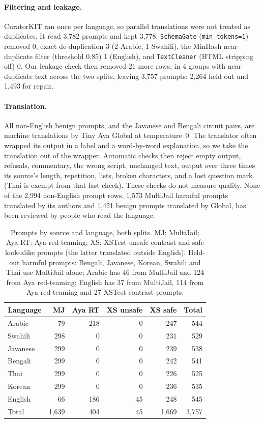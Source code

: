 \documentclass[11pt]{article}
\begin{document}
\paragraph{Filtering and leakage.} CuratorKIT ran once per language, so parallel translations were not treated as
duplicates. It read 3,782 prompts and kept 3,778: \texttt{SchemaGate} (\texttt{min\_tokens=1}) removed 0, exact
de-duplication 3 (2 Arabic, 1 Swahili), the MinHash near-duplicate filter (threshold 0.85) 1 (English), and
\texttt{TextCleaner} (HTML stripping off) 0. Our leakage check then removed 21 more rows, in 4 groups with
near-duplicate text across the two splits, leaving 3,757 prompts: 2,264 held out and 1,493 for repair.

\paragraph{Translation.} All non-English benign prompts, and the Javanese and Bengali circuit pairs, are machine
translations by Tiny Aya Global at temperature~0. The translator often wrapped its output in a label and a
word-by-word explanation, so we take the translation out of the wrapper. Automatic checks then reject empty output,
refusals, commentary, the wrong script, unchanged text, output over three times its source's length, repetition,
lists, broken characters, and a lost question mark (Thai is exempt from that last check). These checks do not
measure quality. None of the 2,994 non-English prompt rows, 1,573 MultiJail harmful prompts translated by its
authors and 1,421 benign prompts translated by Global, has been reviewed by people who read the language.

\begin{table}[ht]
\centering\small
\setlength{\tabcolsep}{2.4pt}
\begin{tabular}{lrrrrr}
\toprule
Language & MJ & Aya RT & XS unsafe & XS safe & Total \\
\midrule
Arabic & 79 & 218 & 0 & 247 & 544 \\
Swahili & 298 & 0 & 0 & 231 & 529 \\
Javanese & 299 & 0 & 0 & 239 & 538 \\
Bengali & 299 & 0 & 0 & 242 & 541 \\
Thai & 299 & 0 & 0 & 226 & 525 \\
Korean & 299 & 0 & 0 & 236 & 535 \\
English & 66 & 186 & 45 & 248 & 545 \\
\midrule
Total & 1,639 & 404 & 45 & 1,669 & 3,757 \\
\bottomrule
\end{tabular}
\caption{Prompts by source and language, both splits. MJ: MultiJail; Aya RT: Aya red-teaming; XS: XSTest unsafe
contrast and safe look-alike prompts (the latter translated outside English). Held-out harmful prompts: Bengali,
Javanese, Korean, Swahili and Thai use MultiJail alone; Arabic has 46 from MultiJail and 124 from Aya
red-teaming; English has 37 from MultiJail, 114 from Aya red-teaming and 27 XSTest contrast prompts.}
\label{tab:prompts}
\end{table}
\end{document}
